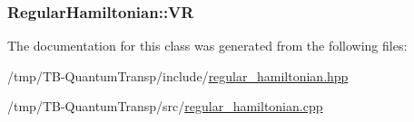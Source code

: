 \subsubsection[{\texorpdfstring{VR}{VR}}]{ Regular\+Hamiltonian\+::\+VR\hspace{0.3cm}{\ttfamily [private]}}\hypertarget{classRegularHamiltonian_a0c1f3be7d09aa3aa214a94020834f9b3}{}\label{classRegularHamiltonian_a0c1f3be7d09aa3aa214a94020834f9b3}


The documentation for this class was generated from the following files\+:\begin{DoxyCompactItemize}
\item 
/tmp/\+T\+B-\/\+Quantum\+Transp/include/\hyperlink{regular__hamiltonian_8hpp}{regular\+\_\+hamiltonian.\+hpp}\item 
/tmp/\+T\+B-\/\+Quantum\+Transp/src/\hyperlink{regular__hamiltonian_8cpp}{regular\+\_\+hamiltonian.\+cpp}\end{DoxyCompactItemize}
